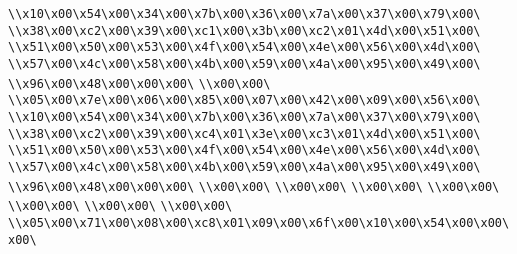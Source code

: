 \verb|\\x10\x00\x54\x00\x34\x00\x7b\x00\x36\x00\x7a\x00\x37\x00\x79\x00\|\newline
\verb|\\x38\x00\xc2\x00\x39\x00\xc1\x00\x3b\x00\xc2\x01\x4d\x00\x51\x00\|\newline
\verb|\\x51\x00\x50\x00\x53\x00\x4f\x00\x54\x00\x4e\x00\x56\x00\x4d\x00\|\newline
\verb|\\x57\x00\x4c\x00\x58\x00\x4b\x00\x59\x00\x4a\x00\x95\x00\x49\x00\|\newline
\verb|\\x96\x00\x48\x00\x00\x00\|\newline
\verb|\\x00\x00\|\newline
\verb|\\x05\x00\x7e\x00\x06\x00\x85\x00\x07\x00\x42\x00\x09\x00\x56\x00\|\newline
\verb|\\x10\x00\x54\x00\x34\x00\x7b\x00\x36\x00\x7a\x00\x37\x00\x79\x00\|\newline
\verb|\\x38\x00\xc2\x00\x39\x00\xc4\x01\x3e\x00\xc3\x01\x4d\x00\x51\x00\|\newline
\verb|\\x51\x00\x50\x00\x53\x00\x4f\x00\x54\x00\x4e\x00\x56\x00\x4d\x00\|\newline
\verb|\\x57\x00\x4c\x00\x58\x00\x4b\x00\x59\x00\x4a\x00\x95\x00\x49\x00\|\newline
\verb|\\x96\x00\x48\x00\x00\x00\|\newline
\verb|\\x00\x00\|\newline
\verb|\\x00\x00\|\newline
\verb|\\x00\x00\|\newline
\verb|\\x00\x00\|\newline
\verb|\\x00\x00\|\newline
\verb|\\x00\x00\|\newline
\verb|\\x00\x00\|\newline
\verb|\\x05\x00\x71\x00\x08\x00\xc8\x01\x09\x00\x6f\x00\x10\x00\x54\x00\x00\x00\|\newline
